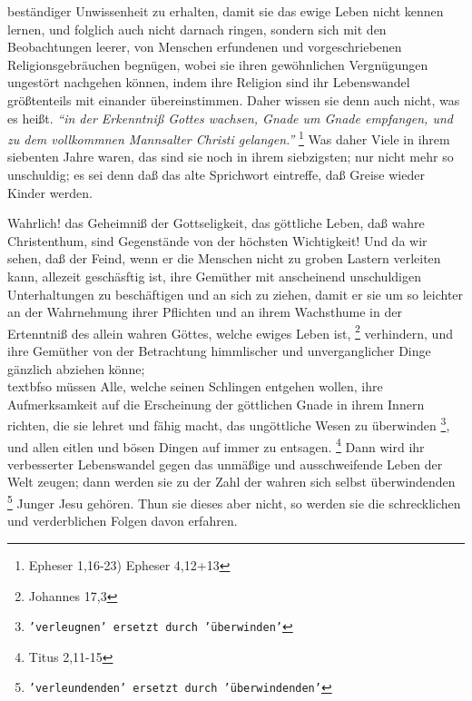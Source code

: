 {beständiger Unwissenheit zu erhalten, damit sie das ewige Leben nicht kennen
lernen, und folglich auch nicht darnach ringen, sondern sich mit den
Beobachtungen leerer, von Menschen erfundenen und vorgeschriebenen
Religionsgebräuchen begnügen, wobei sie ihren gewöhnlichen Vergnügungen
ungestört nachgehen können, indem ihre Religion sind ihr Lebenswandel
größtenteils mit einander übereinstimmen. Daher wissen sie denn auch nicht, was
es heißt.
\textit{"`in der Erkenntniß Gottes wachsen, Gnade um Gnade empfangen, und zu
dem vollkommnen Mannsalter Christi gelangen."'}
\footnote{Epheser 1,16-23) Epheser 4,12+13}
Was daher Viele in ihrem siebenten Jahre waren, das sind sie noch in
ihrem siebzigsten; nur nicht mehr so unschuldig; es sei denn daß das alte
Sprichwort eintreffe, daß Greise wieder Kinder werden.

\medskip

Wahrlich! das Geheimniß der Gottseligkeit, das göttliche
Leben, daß wahre
Christenthum, sind Gegenstände von der höchsten Wichtigkeit! Und da wir sehen,
daß der Feind, wenn er die Menschen nicht zu groben Lastern verleiten kann,
allezeit geschäsftig ist, ihre Gemüther mit anscheinend unschuldigen
Unterhaltungen zu beschäftigen und an sich zu ziehen, damit er sie um so
leichter an der Wahrnehmung ihrer Pflichten und an ihrem Wachsthume in der
Ertenntniß des allein wahren Göttes, welche ewiges Leben ist,
\footnote{Johannes 17,3}
verhindern, und ihre Gemüther von der Betrachtung himmlischer und
unverganglicher Dinge gänzlich abziehen könne;\\textbf{so müssen Alle, welche
seinen
Schlingen entgehen wollen, ihre Aufmerksamkeit auf die Erscheinung der
göttlichen Gnade in ihrem Innern richten, die sie lehret und fähig
macht, das
ungöttliche Wesen zu überwinden
\footnote{\texttt{'verleugnen' ersetzt durch 'überwinden'}}, und allen eitlen
und bösen Dingen auf immer zu
entsagen.}
\footnote{Titus 2,11-15}
Dann wird ihr verbesserter Lebenswandel gegen
das unmäßige und ausschweifende Leben der Welt zeugen; dann werden sie zu der
Zahl der wahren sich selbst überwindenden
\footnote{\texttt{'verleundenden' ersetzt durch 'überwindenden'}} Junger Jesu
gehören. Thun sie dieses
aber nicht, so werden sie die schrecklichen und verderblichen Folgen davon
erfahren.

\medskip

}

